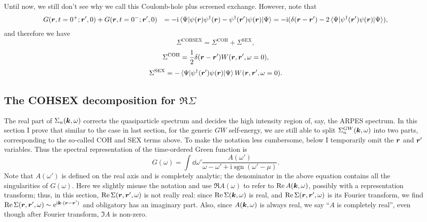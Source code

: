 \documentclass[hyperref, a4paper, 12pt]{report}
\DeclareMathOperator{\sgn}{sgn}
\newcommand*{\ii}{\mathrm{i}}
\newcommand*{\ee}{\mathrm{e}}
\def\\{}%
\begin{document}
Until now, we still don't see 
why we call this Coulomb-hole plus screened exchange.
However, note that 
\[
    \begin{aligned}
        &\quad G(\vb*{r}, t = 0^+; \vb*{r}', 0) + 
        G(\vb*{r}, t = 0^-; \vb*{r}', 0) \\
        &= - \ii \expval*{\psi(\vb*{r}) \psi^\dagger(\vb*{r}) - \psi^\dagger(\vb*{r}') \psi(\vb*{r})}{\Psi} \\
        &= - \ii (\delta(\vb*{r} - \vb*{r}') - 
        2 \expval*{\psi^\dagger(\vb*{r}') \psi(\vb*{r})}{\Psi}),
    \end{aligned}
\]
and therefore we have 
\begin{equation}
    \Sigma^{\text{COHSEX}} = \Sigma^{\text{COH}} + \Sigma^{\text{SEX}},
\end{equation}
\begin{equation}
    \Sigma^{\text{COH}} = \frac{1}{2} \delta(\vb*{r} - \vb*{r}') 
    W(\vb*{r}, \vb*{r}', \omega = 0), 
    \label{eq:sigma-coh-general}
\end{equation}
\begin{equation}
    \Sigma^{\text{SEX}} = - \expval*{\psi^\dagger(\vb*{r}') \psi(\vb*{r})}{\Psi}
    W(\vb*{r}, \vb*{r}', \omega = 0).
    \label{eq:sigma-sex-general}
\end{equation}

\subsection{The COHSEX decomposition for $\Re \Sigma$}

The real part of $\Sigma_n(\vb*{k}, \omega)$ corrects the quasiparticle spectrum 
and decides the high intensity region of, say, the ARPES spectrum.
In this section I prove that 
similar to the case in last section, 
for the generic $GW$ self-energy, 
we are still able to split $\Sigma^{GW}_n(\vb*{k}, \omega)$
into two parts, 
corresponding to the so-called COH and SEX terms above. 
To make the notation less cumbersome,
below I temporarily omit the $\vb*{r}$ and $\vb*{r}'$ variables.
Thus the spectral representation of the time-ordered Green function is 
\begin{equation}
    G(\omega) = \int \dd{\omega'} \frac{A(\omega')}{\omega - \omega' + \ii \sgn(\omega' - \mu)}.
\end{equation}
Note that $A(\omega')$ is defined on the real axis 
and is completely analytic;
the denominator in the above equation contains all the singularities of $G(\omega)$.
Here we slightly misuse the notation 
and use $\Re A(\omega)$ 
to refer to $\Re A(\vb*{k}, \omega)$,
possibly with a representation transform;
thus, in this section, $\Re \Sigma(\vb*{r}, \vb*{r}', \omega)$ 
is not really real: 
since $\Re \Sigma(\vb*{k}, \omega)$ is real, 
and $\Re \Sigma(\vb*{r}, \vb*{r}', \omega)$ is its Fourier transform,
we find $\Re \Sigma(\vb*{r}, \vb*{r}', \omega) \sim \ee^{\ii \vb*{k} \cdot (\vb*{r} - \vb*{r}')}$
and obligatory has an imaginary part. 
Also, since $A(\vb*{k}, \omega)$ is always real, 
we say ``$A$ is completely real'',
even though after Fourier transform, 
$\Im A$ is non-zero.
\end{document}
